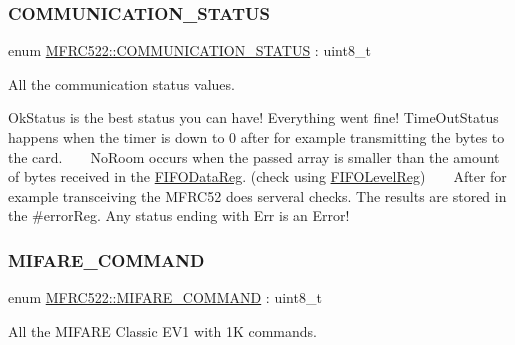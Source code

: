 \subsubsection{\texorpdfstring{C\+O\+M\+M\+U\+N\+I\+C\+A\+T\+I\+O\+N\+\_\+\+S\+T\+A\+T\+US}{COMMUNICATION\_STATUS}}
{\footnotesize\ttfamily enum \mbox{\hyperlink{class_m_f_r_c522_a1160642f3b2b60b5ea7309374a8d760a}{M\+F\+R\+C522\+::\+C\+O\+M\+M\+U\+N\+I\+C\+A\+T\+I\+O\+N\+\_\+\+S\+T\+A\+T\+US}} \+: uint8\+\_\+t}



All the communication status values. 

Ok\+Status is the best status you can have! Everything went fine! Time\+Out\+Status happens when the timer is down to 0 after for example transmitting the bytes to the card. ~\newline
~\newline
 No\+Room occurs when the passed array is smaller than the amount of bytes received in the \mbox{\hyperlink{class_m_f_r_c522_ae7ec09eb8c9c61288a4770175b4b8db7afdbfd2f397b96d1043c808ec26e80328}{F\+I\+F\+O\+Data\+Reg}}. (check using \mbox{\hyperlink{class_m_f_r_c522_ae7ec09eb8c9c61288a4770175b4b8db7a35e5daf30358a0a271dadf50ba6bb4e7}{F\+I\+F\+O\+Level\+Reg}}) ~\newline
~\newline
 After for example transceiving the M\+F\+R\+C52 does serveral checks. The results are stored in the \#error\+Reg. Any status ending with Err is an Error! \mbox{\label{class_m_f_r_c522_a79bd44224bb1ad85e28a0937a6715818}} 
\subsubsection{\texorpdfstring{M\+I\+F\+A\+R\+E\+\_\+\+C\+O\+M\+M\+A\+ND}{MIFARE\_COMMAND}}
{\footnotesize\ttfamily enum \mbox{\hyperlink{class_m_f_r_c522_a79bd44224bb1ad85e28a0937a6715818}{M\+F\+R\+C522\+::\+M\+I\+F\+A\+R\+E\+\_\+\+C\+O\+M\+M\+A\+ND}} \+: uint8\+\_\+t}



All the M\+I\+F\+A\+RE Classic E\+V1 with 1K commands. 

